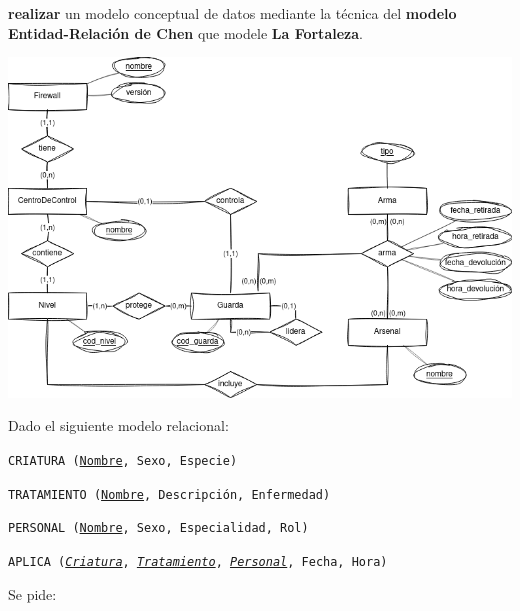\documentclass[12pt,a4paper,addpoints,answers]{exam}
\begin{document}
\begin{questions}
\begin{parts}
\textbf{realizar} un modelo conceptual de datos mediante la técnica del \textbf{modelo Entidad-Relación de Chen} que modele \textbf{La Fortaleza}.


\begin{solution}
    \includegraphics[width=\textwidth]{figs/2024-ordinaria-gcdia-mer.png}
\end{solution}
\end{parts}


\newpage
{}

Dado el siguiente modelo relacional:

\texttt{CRIATURA (\underline{Nombre}, Sexo, Especie)}

\texttt{TRATAMIENTO (\underline{Nombre}, Descripción, Enfermedad)}

\texttt{PERSONAL (\underline{Nombre}, Sexo, Especialidad, Rol)}

\texttt{APLICA (\underline{\emph{Criatura}}, \underline{\emph{Tratamiento}}, \underline{\emph{Personal}}, Fecha, Hora)}

Se pide:
\end{questions}
\end{document}
